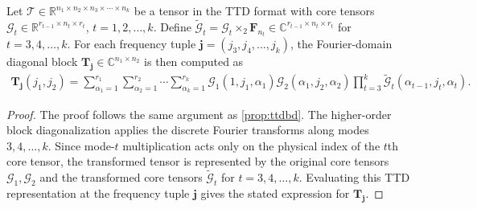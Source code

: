 \documentclass[onefignum,onetabnum]{siamart250211}
\begin{document}

\begin{proposition}
\label{thm:ttd_kth_block_diag}
Let $\mathscr{T}\in\mathbb{R}^{n_1\times n_2\times n_3\times\cdots\times n_k}$ be a tensor in the TTD format with core tensors
$\mathscr{G}_t\in\mathbb{R}^{r_{t-1}\times n_t\times r_t}$,
$t=1,2, \dots,k$. Define $\widetilde{\mathscr{G}}_t
=
\mathscr{G}_t\times_2 \textbf{F}_{n_t}
\in
\mathbb{C}^{r_{t-1}\times n_t\times r_t}$ for 
$t=3, 4, \dots,k$.
For each frequency tuple
$\boldsymbol{j}=(j_3,j_4, \dots,j_k)$, the Fourier-domain diagonal block
$\textbf{T}_{\boldsymbol{j}}\in\mathbb{C}^{n_1\times n_2}$ is then computed as
\begin{align*}
\textbf{T}_{\boldsymbol{j}}(j_1,j_2)
=
\sum_{\alpha_1=1}^{r_1}\sum_{\alpha_2=1}^{r_2}
\cdots
\sum_{\alpha_{k}=1}^{r_{k}}
\mathscr{G}_1(1,j_1,\alpha_1)
\mathscr{G}_2(\alpha_1,j_2,\alpha_2)
\prod_{t=3}^{k}
\widetilde{\mathscr{G}}_t(\alpha_{t-1},j_t,\alpha_t).
\end{align*}
\end{proposition}

\begin{proof}
The proof follows the same argument as \cref{prop:ttdbd}. The higher-order block diagonalization applies the discrete Fourier transforms along modes $3, 4, \dots,k$. Since mode-$t$ multiplication acts only on the physical index of the $t$th  core tensor, the transformed tensor is represented by the original core tensors $\mathscr{G}_1,\mathscr{G}_2$ and the transformed core tensors $\widetilde{\mathscr{G}}_t$ for $t=3, 4, \dots,k$. Evaluating this TTD representation at the frequency tuple $\boldsymbol{j}$ gives the stated expression for $\textbf{T}_{\boldsymbol{j}}$.
\end{proof}
\end{document}

